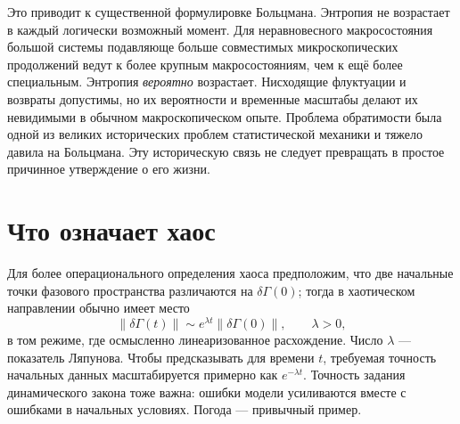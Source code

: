 \begin{classroomqa}
\end{classroomqa}

\begin{classroomqa}
\end{classroomqa}

Это приводит к существенной формулировке Больцмана. Энтропия не возрастает в каждый логически возможный момент. Для неравновесного макросостояния большой системы подавляюще больше совместимых микроскопических продолжений ведут к более крупным макросостояниям, чем к ещё более специальным. Энтропия \emph{вероятно} возрастает. Нисходящие флуктуации и возвраты допустимы, но их вероятности и временные масштабы делают их невидимыми в обычном макроскопическом опыте. Проблема обратимости была одной из великих исторических проблем статистической механики и тяжело давила на Больцмана. Эту историческую связь не следует превращать в простое причинное утверждение о его жизни.

\section{Что означает хаос}

Для более операционального определения хаоса предположим, что две начальные точки фазового пространства различаются на \(\delta\Gamma(0)\); тогда в хаотическом направлении обычно имеет место
\begin{equation}
 \lVert\delta\Gamma(t)\rVert
 \sim e^{\lambda t}\lVert\delta\Gamma(0)\rVert,
 \qquad \lambda>0,
 \label{eq:sm7-lyapunov-growth}
\end{equation}
в том режиме, где осмысленно линеаризованное расхождение. Число \(\lambda\) — показатель Ляпунова. Чтобы предсказывать для времени \(t\), требуемая точность начальных данных масштабируется примерно как \(e^{-\lambda t}\). Точность задания динамического закона тоже важна: ошибки модели усиливаются вместе с ошибками в начальных условиях. Погода — привычный пример.

